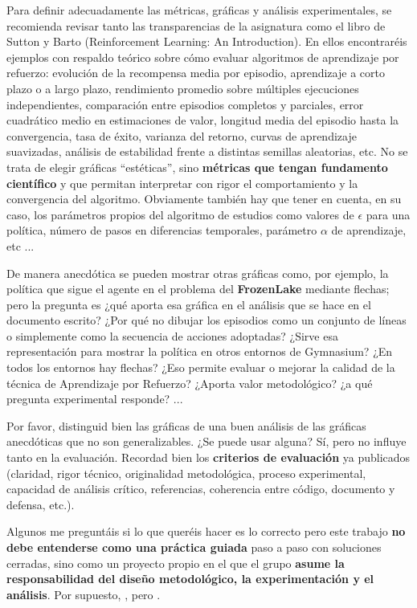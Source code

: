 \documentclass[a4paper, 11pt]{article}
\begin{document}
Para definir adecuadamente las métricas, gráficas y análisis experimentales, se recomienda revisar tanto las transparencias de la asignatura como el libro de Sutton y Barto (Reinforcement Learning: An Introduction). En ellos encontraréis ejemplos con respaldo teórico sobre cómo evaluar algoritmos de aprendizaje por refuerzo: evolución de la recompensa media por episodio, aprendizaje a corto plazo o a largo plazo, rendimiento promedio sobre múltiples ejecuciones independientes, comparación entre episodios completos y parciales, error cuadrático medio en estimaciones de valor, longitud media del episodio hasta la convergencia, tasa de éxito, varianza del retorno, curvas de aprendizaje suavizadas,  análisis de estabilidad frente a distintas semillas aleatorias, etc. No se trata de elegir gráficas “estéticas”, sino \textbf{métricas que tengan fundamento científico} y que permitan interpretar con rigor el comportamiento y la convergencia del algoritmo. Obviamente también hay que tener en cuenta, en su caso, los parámetros propios del algoritmo de estudios como valores de $\epsilon$ para una política, número de pasos en diferencias temporales, parámetro $\alpha$ de aprendizaje, etc ...

De manera anecdótica se pueden mostrar otras gráficas como, por ejemplo, la política que sigue el agente en el problema del \textbf{FrozenLake} mediante flechas; pero la pregunta es ¿qué aporta esa gráfica en el análisis que se hace en el documento escrito? ¿Por qué no dibujar los episodios como un conjunto de líneas o simplemente como la secuencia de acciones adoptadas? ¿Sirve esa representación para mostrar la política en otros entornos de Gymnasium? ¿En todos los entornos hay flechas? ¿Eso permite evaluar o mejorar la calidad de la técnica de Aprendizaje por Refuerzo? ¿Aporta valor metodológico? ¿a qué pregunta experimental responde? ...


Por favor, distinguid bien las gráficas de una buen análisis de las gráficas anecdóticas que no son generalizables. ¿Se puede usar alguna? Sí, pero no influye tanto en la evaluación. Recordad bien los \textbf{criterios de evaluación} ya publicados (claridad, rigor técnico, originalidad metodológica, proceso experimental, capacidad de análisis crítico, referencias, coherencia entre código, documento y defensa, etc.). 


Algunos me preguntáis si lo que queréis hacer es lo correcto pero este trabajo \textbf{no debe entenderse como una práctica guiada} paso a paso con soluciones cerradas, sino como un proyecto propio en el que el grupo \textbf{asume la responsabilidad del diseño metodológico, la experimentación y el análisis}. Por supuesto, , pero . 
\end{document}

